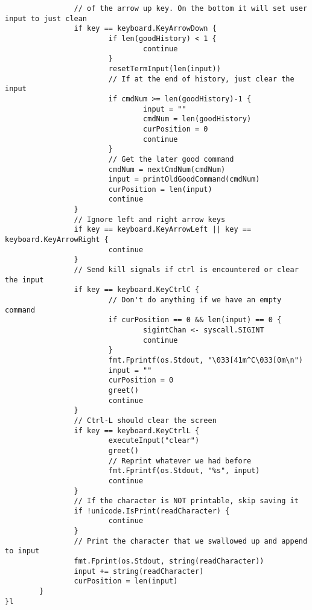 \documentclass[12pt]{article}
\begin{document}
\begin{verbatim}
                // of the arrow up key. On the bottom it will set user input to just clean
                if key == keyboard.KeyArrowDown {
                        if len(goodHistory) < 1 {
                                continue
                        }
                        resetTermInput(len(input))
                        // If at the end of history, just clear the input
                        if cmdNum >= len(goodHistory)-1 {
                                input = ""
                                cmdNum = len(goodHistory)
                                curPosition = 0
                                continue
                        }
                        // Get the later good command
                        cmdNum = nextCmdNum(cmdNum)
                        input = printOldGoodCommand(cmdNum)
                        curPosition = len(input)
                        continue
                }
                // Ignore left and right arrow keys
                if key == keyboard.KeyArrowLeft || key == keyboard.KeyArrowRight {
                        continue
                }
                // Send kill signals if ctrl is encountered or clear the input
                if key == keyboard.KeyCtrlC {
                        // Don't do anything if we have an empty command
                        if curPosition == 0 && len(input) == 0 {
                                sigintChan <- syscall.SIGINT
                                continue
                        }
                        fmt.Fprintf(os.Stdout, "\033[41m^C\033[0m\n")
                        input = ""
                        curPosition = 0
                        greet()
                        continue
                }
                // Ctrl-L should clear the screen
                if key == keyboard.KeyCtrlL {
                        executeInput("clear")
                        greet()
                        // Reprint whatever we had before
                        fmt.Fprintf(os.Stdout, "%s", input)
                        continue
                }
                // If the character is NOT printable, skip saving it
                if !unicode.IsPrint(readCharacter) {
                        continue
                }
                // Print the character that we swallowed up and append to input
                fmt.Fprint(os.Stdout, string(readCharacter))
                input += string(readCharacter)
                curPosition = len(input)
        }
}l
\end{verbatim}
\end{document}
